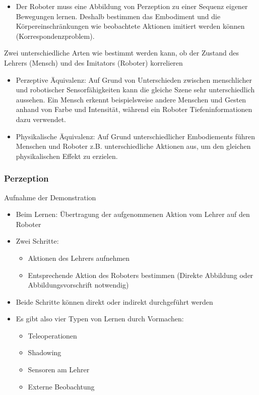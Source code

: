 \documentclass[paper=a4, fontsize=11pt]{scrartcl} %
\numberwithin{equation}{section} %
\numberwithin{figure}{section} %
\numberwithin{table}{section} %
\begin{document}
\begin{itemize}
\begin{itemize}
\item Der Roboter muss eine Abbildung von Perzeption zu einer Sequenz eigener Bewegungen lernen. Deshalb bestimmen das Embodiment und die Körpereinschränkungen wie beobachtete Aktionen imitiert werden können (Korrespondenzproblem).
\end{itemize}
\end{itemize}

Zwei unterschiedliche Arten wie bestimmt werden kann, ob der Zustand des Lehrers (Mensch) und des Imitators (Roboter) korrelieren
\begin{itemize}
\item Perzeptive Äquivalenz: Auf Grund von Unterschieden zwischen menschlicher und robotischer Sensorfähigkeiten kann die gleiche Szene sehr unterschiedlich aussehen. Ein Mensch erkennt beispielsweise andere Menschen und Gesten anhand von Farbe und Intensität, während ein Roboter Tiefeninformationen dazu verwendet.
\item Physikalische Äquivalenz: Auf Grund unterschiedlicher Embodiements führen Menschen und Roboter z.B. unterschiedliche Aktionen aus, um den gleichen physikalischen Effekt zu erzielen.
\end{itemize}

\subsubsection{Perzeption}

Aufnahme der Demonstration
\begin{itemize}
\item Beim Lernen: Übertragung der aufgenommenen Aktion vom Lehrer auf den Roboter
\item Zwei Schritte:
\begin{itemize}
\item Aktionen des Lehrers aufnehmen
\item Entsprechende Aktion des Roboters bestimmen (Direkte Abbildung oder Abbildungsvorschrift notwendig)
\end{itemize}
\item Beide Schritte können direkt oder indirekt durchgeführt werden
\item Es gibt also vier Typen von Lernen durch Vormachen:
\begin{itemize}
\item Teleoperationen
\item Shadowing
\item Sensoren am Lehrer
\item Externe Beobachtung
\end{itemize}
\end{itemize}
\end{document}
